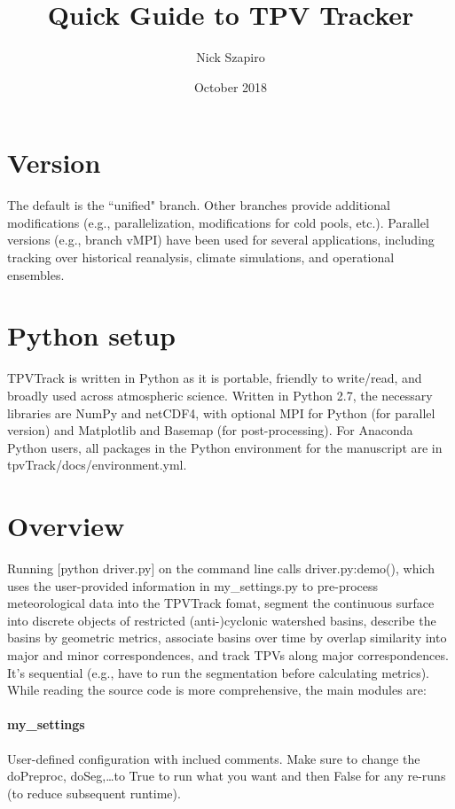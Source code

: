 \documentclass[a4paper]{article}
\title{Quick Guide to TPV Tracker}
\author{Nick Szapiro}
\date{October 2018}
\begin{document}
\maketitle

\section{Version}
The default is the ``unified" branch. Other branches provide additional modifications (e.g., parallelization, modifications for cold pools, etc.). Parallel versions (e.g., branch vMPI) have been used for several applications, including tracking over historical reanalysis, climate simulations, and operational ensembles.

\section{Python setup}
TPVTrack is written in Python as it is portable, friendly to write/read, and broadly used across atmospheric science.
Written in Python 2.7, the necessary libraries are NumPy and netCDF4, with optional MPI for Python (for parallel version) and Matplotlib and Basemap (for post-processing).
For Anaconda Python users, all packages in the Python environment for the manuscript are in tpvTrack/docs/environment.yml.

\section{Overview}
Running [python driver.py] on the command line calls driver.py:demo(), which uses the user-provided information in my\_settings.py to pre-process meteorological data into the TPVTrack fomat, segment the continuous surface into discrete objects of restricted (anti-)cyclonic watershed basins, describe the basins by geometric metrics, associate basins over time by overlap similarity into major and minor correspondences, and track TPVs along major correspondences. It's sequential (e.g., have to run the segmentation before calculating metrics). While reading the source code is more comprehensive, the main modules are:

\paragraph{my\_settings} User-defined configuration with inclued comments. Make sure to change the doPreproc, doSeg,\dots to True to run what you want and then False for any re-runs (to reduce subsequent runtime).
\end{document}

